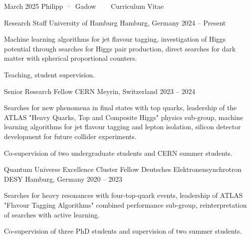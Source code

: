 \documentclass[11pt, letterpaper, draft]{academic-cv}
\begin{document}
\makecvheader

\makecvfooter
  {March 2025}
  {Philipp~·~Gadow ~~~ Curriculum Vitae}
  {\thepage}

\begin{cventries}

    \cventry
      {Research Staff} %
      {University of Hamburg} %
      {Hamburg, Germany} %
      {2024 -- Present} %
      {
        \begin{cvitems} %
          \item {Machine learning algorithms for jet flavour tagging, investigation of Higgs potential through searches for Higgs pair production, direct searches for dark matter with spherical proportional counters.}
          \item {Teaching, student supervision.}
        \end{cvitems}
      }

    \cventry
      {Senior Research Fellow} %
      {CERN} %
      {Meyrin, Switzerland} %
      {2023 -- 2024} %
      {
        \begin{cvitems} %
          \item {Searches for new phenomena in final states with top quarks, leadership of the ATLAS "Heavy Quarks, Top and Composite Higgs" physics sub-group, machine learning algorithms for jet flavour tagging and lepton isolation, silicon detector development for future collider experiments.}
          \item {Co-supervision of two undergraduate students and CERN summer students.}
        \end{cvitems}
      }
  
    \cventry
      {Quantum Universe Excellence Cluster Fellow} %
      {Deutsches Elektronensynchrotron DESY} %
      {Hamburg, Germany} %
      {2020 -- 2023} %
      {
        \begin{cvitems} %
          \item {Searches for heavy resonances with four-top-quark events, leadership of ATLAS "Flavour Tagging Algorithms" combined performance sub-group, reinterpretation of searches with active learning. }
          \item {Co-supervision of three PhD students and supervision of two summer students.}
        \end{cvitems}
      }
  

\end{cventries}
\end{document}
